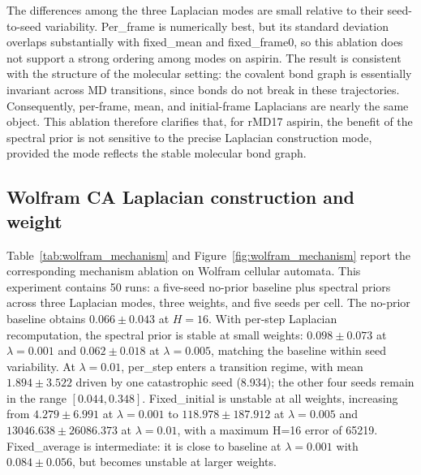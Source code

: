 The differences among the three Laplacian modes are small relative to their seed-to-seed variability. Per\_frame is numerically best, but its standard deviation overlaps substantially with fixed\_mean and fixed\_frame0, so this ablation does not support a strong ordering among modes on aspirin. The result is consistent with the structure of the molecular setting: the covalent bond graph is essentially invariant across MD transitions, since bonds do not break in these trajectories. Consequently, per-frame, mean, and initial-frame Laplacians are nearly the same object. This ablation therefore clarifies that, for rMD17 aspirin, the benefit of the spectral prior is not sensitive to the precise Laplacian construction mode, provided the mode reflects the stable molecular bond graph.

\subsection{Wolfram CA Laplacian construction and weight}\label{sec:wolfram_mechanism}

Table~\ref{tab:wolfram_mechanism} and Figure~\ref{fig:wolfram_mechanism} report the corresponding mechanism ablation on Wolfram cellular automata. This experiment contains 50 runs: a five-seed no-prior baseline plus spectral priors across three Laplacian modes, three weights, and five seeds per cell. The no-prior baseline obtains \(0.066 \pm 0.043\) at \(H=16\). With per-step Laplacian recomputation, the spectral prior is stable at small weights: \(0.098 \pm 0.073\) at \(\lambda=0.001\) and \(0.062 \pm 0.018\) at \(\lambda=0.005\), matching the baseline within seed variability. At \(\lambda=0.01\), per\_step enters a transition regime, with mean \(1.894 \pm 3.522\) driven by one catastrophic seed (8.934); the other four seeds remain in the range \([0.044, 0.348]\). Fixed\_initial is unstable at all weights, increasing from \(4.279 \pm 6.991\) at \(\lambda=0.001\) to \(118.978 \pm 187.912\) at \(\lambda=0.005\) and \(13046.638 \pm 26086.373\) at \(\lambda=0.01\), with a maximum H=16 error of 65219. Fixed\_average is intermediate: it is close to baseline at \(\lambda=0.001\) with \(0.084 \pm 0.056\), but becomes unstable at larger weights.

